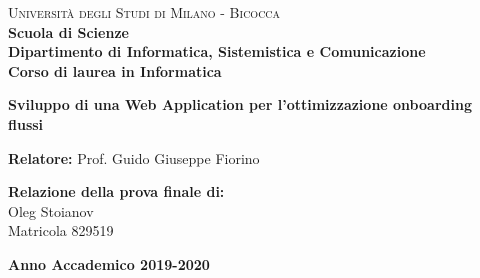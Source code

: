 \documentclass[corpo=11pt,numerazioneromana]{toptesi}
\begin{document}
\begin{titlepage}
        
        \noindent
        \begin{minipage}[t]{0.18\textwidth}
        \end{minipage}
        \begin{minipage}[t]{0.83\textwidth}
        {
                {\textsc{Università degli Studi di Milano - Bicocca}} \\
                \textbf{Scuola di Scienze} \\
                \textbf{Dipartimento di Informatica, Sistemistica e Comunicazione} \\
                \textbf{Corso di laurea in Informatica} \\
                \par
        }
        \end{minipage}
        
	\vspace{40mm}
        
	\begin{center}
            {\LARGE{
                    \textbf{Sviluppo di una Web Application per l’ottimizzazione onboarding flussi}
                    \par
            }}
        \end{center}
        
        \vspace{40mm}

        \noindent
        {\large \textbf{Relatore:} Prof. Guido Giuseppe Fiorino } \\

        
        \vspace{10mm}

        \begin{flushright}
            {\large \textbf{Relazione della prova finale di:}} \\
            \large{Oleg Stoianov} \\
            \large{Matricola 829519} 
        \end{flushright}
        
        \vspace{30mm}
        \begin{center}
            {\large{\bf Anno Accademico 2019-2020}}
        \end{center}

        \restoregeometry
        
\end{titlepage}
\end{document}
